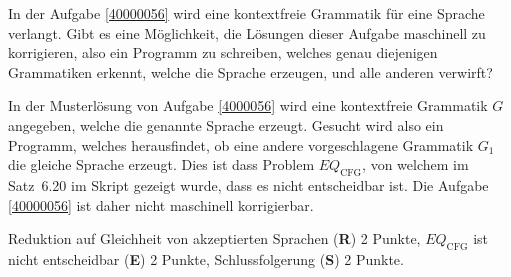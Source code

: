 In der Aufgabe \ref{40000056} wird eine kontextfreie Grammatik für eine
Sprache verlangt.
Gibt es eine Möglichkeit, die Lösungen dieser Aufgabe maschinell zu
korrigieren, also ein Programm zu schreiben, welches genau diejenigen
Grammatiken erkennt, welche die Sprache erzeugen, und alle anderen verwirft?


\begin{loesung}
In der Musterlösung von Aufgabe \ref{4000056} wird eine kontextfreie
Grammatik $G$ angegeben, welche die genannte Sprache erzeugt.
Gesucht wird also ein Programm, welches herausfindet, ob eine andere
vorgeschlagene Grammatik $G_1$ die gleiche Sprache erzeugt.
Dies ist dass Problem $\textit{EQ}_{\text{CFG}}$, von welchem im Satz~6.20
im Skript gezeigt wurde, dass es nicht entscheidbar ist.
Die Aufgabe \ref{40000056} ist daher nicht maschinell korrigierbar.
\end{loesung}

\begin{bewertung}
Reduktion auf Gleichheit von akzeptierten Sprachen ({\bf R}) 2 Punkte,
$\textit{EQ}_{\text{CFG}}$ ist nicht entscheidbar ({\bf E}) 2 Punkte,
Schlussfolgerung ({\bf S}) 2 Punkte.
\end{bewertung}

